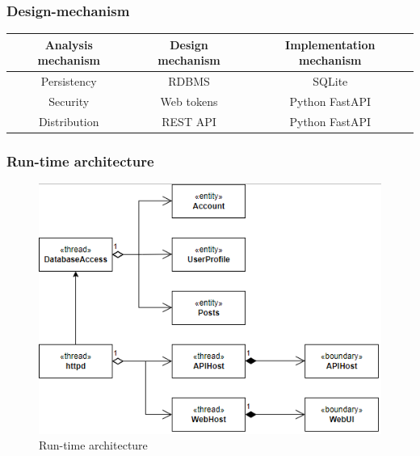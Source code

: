 \documentclass[a4paper]{article}
\begin{document}
\subsubsection{Design-mechanism}
\begin{center}
  \begin{tabular} { | c | c | c |}
    \hline
    \textbf{Analysis mechanism} & \textbf{Design mechanism} & \textbf{Implementation mechanism} \\
    \hline
    Persistency & RDBMS & SQLite \\
    \hline
    Security & Web tokens & Python FastAPI \\
    \hline
    Distribution & REST API & Python FastAPI \\
    \hline
  \end{tabular}
\end{center}

\subsubsection{Run-time architecture}
\begin{figure}[H]
  \centering
  \includegraphics[width=1.0\textwidth]{runtime_architecture.png}
  \caption{Run-time architecture}
  \label{fig:fig36}
\end{figure}
\end{document}
